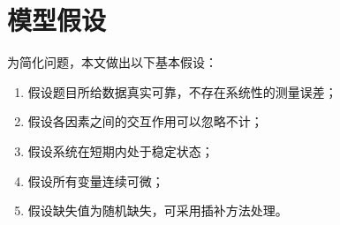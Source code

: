 \section{模型假设}

为简化问题，本文做出以下基本假设：

\begin{enumerate}
  \item 假设题目所给数据真实可靠，不存在系统性的测量误差；
  \item 假设各因素之间的交互作用可以忽略不计；
  \item 假设系统在短期内处于稳定状态；
  \item 假设所有变量连续可微；
  \item 假设缺失值为随机缺失，可采用插补方法处理。
\end{enumerate}
